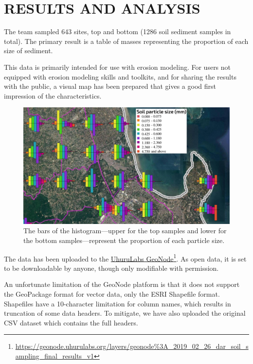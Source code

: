 \documentclass[a4paper,12pt,twoside]{article}
\begin{document}
\newpage 
\color{RHblue}
\section{RESULTS AND ANALYSIS}
\label{resultsandanalysis}
\color{RHgrey}
The team sampled 643 sites, top and bottom (1286 soil sediment samples in total). The primary result is a table of masses representing the proportion of each size of sediment.

This data is primarily intended for use with erosion modeling. For users not equipped with erosion modeling skills and toolkits, and for sharing the results with the public, a visual map has been prepared that gives a good first impression of the characteristics.

\begin{figure}[h]
  \caption{The bars of the histogram---upper for the top samples and lower for the bottom samples---represent the proportion of each particle size.}
  \centering
  \includegraphics[width=1.1\textwidth]{soil_map_detail_peninsula_with_legend}
\end{figure}

The data has been uploaded to the \href{https://geonode.uhurulabs.org/layers/geonode\%3A_2019_02_26_dar_soil_sampling_final_results_v1}{UhuruLabs GeoNode}\footnote{\url {https://geonode.uhurulabs.org/layers/geonode\%3A_2019_02_26_dar_soil_sampling_final_results_v1}}. As open data, it is set to be downloadable by anyone, though only modifiable with permission.

An unfortunate limitation of the GeoNode platform is that it does not support the GeoPackage format for vector data, only the ESRI Shapefile format. Shapefiles have a 10-character limitation for column names, which results in truncation of some data headers. To mitigate, we have also uploaded the original CSV dataset which contains the full headers. 
\end{document}
